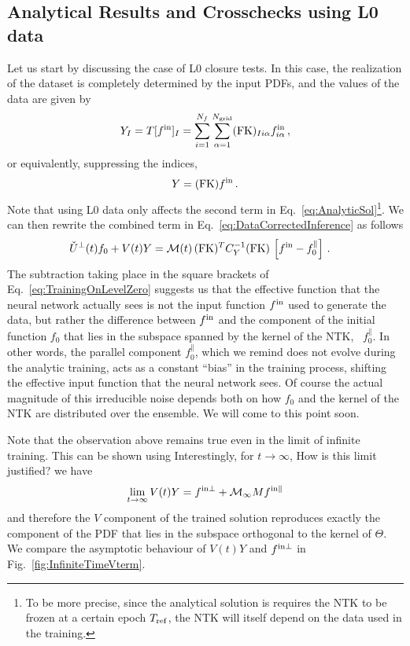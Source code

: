 \subsection{Analytical Results and Crosschecks using L0 data}
\label{sec:AnalyticalChecks}
Let us start by discussing the case of L0 closure tests. In this case, the realization
of the dataset is completely determined by the input PDFs, and the values of the data
are given by
\begin{equation}
    \label{eq:DataL0}
    Y_I = T[f^{\rm in}]_I
        = \sum_{i=1}^{N_{f}} \sum_{\alpha=1}^{N_{\mathrm{grid}}} (\mathrm{FK})_{Ii\alpha} f^{\rm in}_{i\alpha}\, ,
\end{equation}
or equivalently, suppressing the indices,
\begin{equation}
    \label{eq:DataL0NoIndices}
    Y = (\mathrm{FK}) f^{\rm in}\, .
\end{equation}
Note that using L0 data only affects the second term in
Eq.~\ref{eq:AnalyticSol}\footnote{To be more precise, since the analytical
solution is requires the NTK to be frozen at a certain epoch $T_{\rm ref}$, the
NTK will itself depend on the data used in the training.}. We can then rewrite the
combined term in Eq.~\eqref{eq:DataCorrectedInference} as follows
\begin{align}
  \label{eq:TrainingOnLevelZero}
  \check{U}^\perp(t) f_0 + V(t) Y 
    &= \mathcal{M}(t)\, (\mathrm{FK})^T C_{Y}^{-1} (\mathrm{FK})\, 
      \left[f^{\rm in} - f_{0}^\parallel\right]\, .
\end{align}
The subtraction taking place in the square brackets of
Eq.~\eqref{eq:TrainingOnLevelZero} suggests us that the effective function that
the neural network actually sees is not the input function $f^{\rm in}$ used to
generate the data, but rather the difference between $f^{\rm in}$ and the component of
the initial function $f_0$ that lies in the subspace spanned by the kernel of
the NTK, \ie\ $f_0^\parallel$. In other words, the parallel component
$f_0^\parallel$, which we remind does not evolve during the analytic training,
acts as a constant ``bias'' in the training process, shifting the effective
input function that the neural network sees. Of course the actual magnitude of
this irreducible noise depends both on how $f_0$ and the kernel of the NTK are
distributed over the ensemble. We will come to this point soon.

Note that the observation above remains true even in the limit of infinite training.
This can be shown using
Interestingly, for $t\to\infty$, \ac{How is
this limit justified?} we have
\begin{align}
    \label{eq:LevelZeroClosureInfiniteTraining}
    \lim_{t\to\infty} V(t) Y = f^{\rm in \perp} + \mathcal{M}_{\infty} M f^{\rm in \parallel}
\end{align}
and therefore the $V$ component of the trained solution reproduces exactly the
component of the PDF that lies in  the subspace orthogonal to the kernel of
$\Theta$. We compare the asymptotic behaviour of $V(t) Y$ and $f^{\rm in \perp}$ in
Fig.~\ref{fig:InfiniteTimeVterm}.

